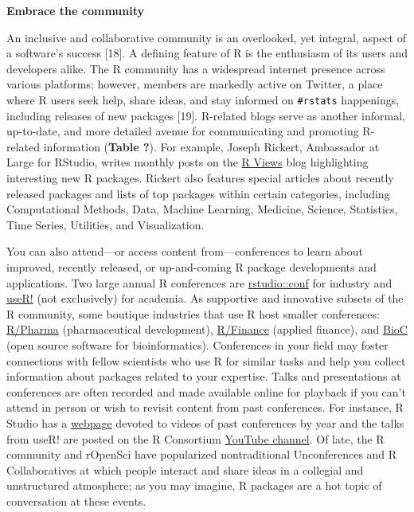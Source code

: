\documentclass[10pt,letterpaper]{article}
\begin{document}
\textbf{Embrace the community}

An inclusive and collaborative community is an overlooked, yet integral,
aspect of a software's success {[}18{]}. A defining feature of R is the
enthusiasm of its users and developers alike. The R community has a
widespread internet presence across various platforms; however, members
are markedly active on Twitter, a place where R users seek help, share
ideas, and stay informed on \texttt{\#rstats} happenings, including
releases of new packages {[}19{]}. R-related blogs serve as another
informal, up-to-date, and more detailed avenue for communicating and
promoting R-related information (\textbf{Table ?}). For example, Joseph
Rickert, Ambassador at Large for RStudio, writes monthly posts on the
\href{https://rviews.rstudio.com/}{R Views} blog highlighting
interesting new R packages. Rickert also features special articles about
recently released packages and lists of top packages within certain
categories, including Computational Methods, Data, Machine Learning,
Medicine, Science, Statistics, Time Series, Utilities, and
Visualization.

You can also attend---or access content from---conferences to learn
about improved, recently released, or up-and-coming R package
developments and applications. Two large annual R conferences are
\href{https://rstudio.com/conference/}{rstudio::conf} for industry and
\href{https://www.r-consortium.org/}{useR!} (not exclusively) for
academia. As supportive and innovative subsets of the R community, some
boutique industries that use R host smaller conferences:
\href{https://rinpharma.com/}{R/Pharma} (pharmaceutical development),
\href{https://www.rinfinance.com/}{R/Finance} (applied finance), and
\href{https://www.bioconductor.org/help/events/}{BioC} (open source
software for bioinformatics). Conferences in your field may foster
connections with fellow scientists who use R for similar tasks and help
you collect information about packages related to your expertise. Talks
and presentations at conferences are often recorded and made available
online for playback if you can't attend in person or wish to revisit
content from past conferences. For instance, R Studio has a
\href{https://rstudio.com/resources/rstudioconf-2020/}{webpage} devoted
to videos of past conferences by year and the talks from useR! are
posted on the R Consortium
\href{https://www.youtube.com/channel/UC_R5smHVXRYGhZYDJsnXTwg/featured}{YouTube
channel}. Of late, the R community and rOpenSci have popularized
nontraditional Unconferences and R Collaboratives at which people
interact and share ideas in a collegial and unstructured atmosphere; as
you may imagine, R packages are a hot topic of conversation at these
events.
\end{document}
